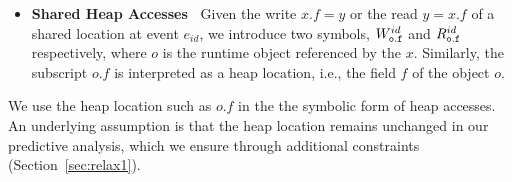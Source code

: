\begin{itemize}
\begin{itemize}
\item  {\bf Shared Heap Accesses\ }    Given the write $x.f=y$ or the read $y=x.f$ of a shared location at event $e_{id}$, we introduce two symbols, $W^{id}_{\tt o.f }$ and $R^{id}_{\tt  o.f }$ respectively, where $o$ is the runtime object referenced by the $x$. Similarly, the subscript $o.f$ is interpreted as a heap location, i.e., the field $f$ of the object $o$.
\end{itemize}
We use the heap location such as $o.f$ in the the symbolic form of heap accesses. An underlying assumption is that the heap location remains unchanged in our predictive analysis, which we ensure through additional constraints (Section~\ref{sec:relax1}).
\end{itemize}





%



